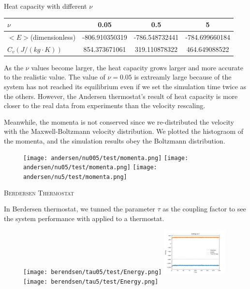 \documentclass{article}
\begin{document}
\begin{spacing}{1}
\begin{center}
Heat capacity with different $\nu$

\begin{tabular}{lccc}
\hline
$\nu$ & 0.05 & 0.5 & 5\\ \hline  
$<E>$(dimensionless) & -806.910350319 & -786.548732441 & -784.699660184 \\
$C_v(J/(kg\cdot K))$ & 854.373671061 & 319.110878322 & 464.649088522 \\\hline
\end{tabular}
\end{center}

As the $\nu$ values become larger, the heat capacity grows larger and more accurate to the realistic value. The value of $\nu=0.05$ is extreamly large because of the system has not reached its equilibrium even if we set the simulation time twice as the others. However, the Andersen thermostat's result of heat capacity is more closer to the real data from experiments than the velocity rescaling.

Meanwhile, the momenta is not conserved since we re-distributed the velocity with the Maxwell-Boltzmann velocity distribution. We plotted the histograom of the momenta, and the simulation results obey the Boltzmann distribution.

\begin{figure}[htbp]
  \centering
  \texttt{[image: andersen/nu005/test/momenta.png]}
  \texttt{[image: andersen/nu05/test/momenta.png]}
  \texttt{[image: andersen/nu5/test/momenta.png]}
\end{figure}


\vspace{1.5em}
\textsc{\Large Berdersen Thermostat}

In Berdersen thermostat, we tunned the parameter $\tau$ as the coupling factor to see the system performance with applied to a thermostat.


\begin{figure}[htbp]
  \centering
  \texttt{[image: berendsen/tau05/test/Energy.png]}
  \includegraphics[width=0.3\textwidth]{berendsen/tau1/test/Energy.png}
  \texttt{[image: berendsen/tau5/test/Energy.png]}
\end{figure}


\end{spacing}
\end{document}
